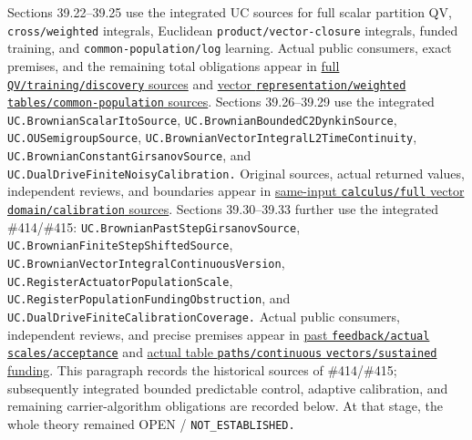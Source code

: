 \documentclass[
  english,
  11pt,
  oneside]{book}
\begin{document}
Sections 39.22--39.25 use the integrated UC sources for full scalar partition QV, \nolinkurl{cross/weighted} integrals, Euclidean \nolinkurl{product/vector-closure} integrals, funded training, and \nolinkurl{common-population/log} learning. Actual public consumers, exact premises, and the remaining total obligations appear in \href{../formalization/ueot-core/docs/compression/theory_completion/unified_closure/full_qv_vector_training_source_v1/RESULTS_AND_OPEN_OBLIGATIONS.md}{full \nolinkurl{QV/training/discovery} sources} and \href{../formalization/ueot-core/docs/compression/theory_completion/unified_closure/vector_weighted_population_source_v1/RESULTS_AND_OPEN_OBLIGATIONS.md}{vector \nolinkurl{representation/weighted} \nolinkurl{tables/common-population} sources}. Sections 39.26--39.29 use the integrated \nolinkurl{UC.BrownianScalarItoSource}, \nolinkurl{UC.BrownianBoundedC2DynkinSource}, \nolinkurl{UC.OUSemigroupSource}, \nolinkurl{UC.BrownianVectorIntegralL2TimeContinuity}, \nolinkurl{UC.BrownianConstantGirsanovSource}, and \nolinkurl{UC.DualDriveFiniteNoisyCalibration.} Original sources, actual returned values, independent reviews, and boundaries appear in \href{../formalization/ueot-core/docs/compression/theory_completion/unified_closure/ito_vector_calibration_source_v1/RESULTS_AND_OPEN_OBLIGATIONS.md}{same-input \nolinkurl{calculus/full} vector \nolinkurl{domain/calibration} sources}. Sections 39.30--39.33 further use the integrated \#414/\#415: \nolinkurl{UC.BrownianPastStepGirsanovSource}, \nolinkurl{UC.BrownianFiniteStepShiftedSource}, \nolinkurl{UC.BrownianVectorIntegralContinuousVersion}, \nolinkurl{UC.RegisterActuatorPopulationScale}, \nolinkurl{UC.RegisterPopulationFundingObstruction}, and \nolinkurl{UC.DualDriveFiniteCalibrationCoverage.} Actual public consumers, independent reviews, and precise premises appear in \href{../formalization/ueot-core/docs/compression/theory_completion/unified_closure/past_feedback_scale_source_v1/RESULTS_AND_OPEN_OBLIGATIONS.md}{past \nolinkurl{feedback/actual} \nolinkurl{scales/acceptance}} and \href{../formalization/ueot-core/docs/compression/theory_completion/unified_closure/table_continuous_funding_source_v1/RESULTS_AND_OPEN_OBLIGATIONS.md}{actual table \nolinkurl{paths/continuous} \nolinkurl{vectors/sustained} funding}. This paragraph records the historical sources of \#414/\#415; subsequently integrated bounded predictable control, adaptive calibration, and remaining carrier-algorithm obligations are recorded below. At that stage, the whole theory remained OPEN / \nolinkurl{NOT_ESTABLISHED.}
\end{document}

